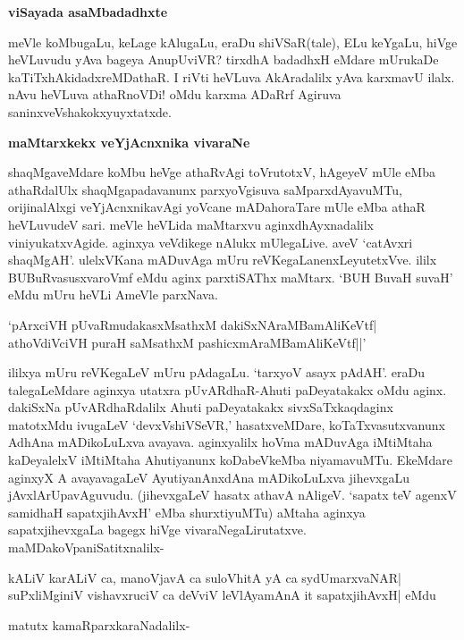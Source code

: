 {\bigskip
\noindent
{\large\bf viSayada asaMbadadhxte}}\label{page115}
\medskip

\noindent
meVle koMbugaLu, keLage kAlugaLu, eraDu shiVSaR(tale), ELu keYgaLu, hiVge heVLuvudu yAva bageya AnupUviVR? tirxdhA badadhxH eMdare mUrukaDe kaTiTxhAkidadxreMDathaR. I riVti heVLuva AkAradalilx yAva karxmavU ilalx. nAvu heVLuva athaRnoVDi! oMdu karxma ADaRrf Agiruva saninxveVshakokxyuyxtatxde.

{\bigskip
\noindent
{\large\bf maMtarxkekx veYjAcnxnika vivaraNe}}\label{page115}
\medskip

\noindent
shaqMgaveMdare koMbu heVge athaRvAgi toVrutotxV, hAgeyeV mUle eMba athaRdalUlx shaqMga\-pada\-vanunx parxyoVgisuva saMparxdAyavuMTu, orijinalAlxgi veYjAcnxnikavAgi yoVcane mADahoraTare mUle eMba athaR heVLuvudeV sari. meVle heVLida maMtarxvu aginxdhAyxnadalilx viniyukatxvAgide. aginxya veVdikege nAlukx mUlegaLive. aveV `catAvxri shaqMgAH'. ulelxVKana mADuvAga mUru reVKegaLanenxLeyu\-tetxVve. ililx BUBuRvasusxvaroVmf eMdu aginx parxtiSAThx maMtarx. `BUH BuvaH suvaH' eMdu mUru heVLi AmeVle parxNava.

\begin{shloka}
`pArxciVH pUvaRmudakasxMsathxM dakiSxNAraMBamAliKeVtf|\\\label{115}
athoVdiVciVH puraH saMsathxM pashicxmAraMBamAliKeVtf||'
\end{shloka}

ililxya mUru reVKegaLeV mUru pAdagaLu. `tarxyoV asayx pAdAH'. eraDu 
talegaLeMdare aginxya\- utatxra pUvARdhaR-Ahuti paDeyatakakx oMdu aginx. dakiSxNa pUvARdhaRdalilx Ahuti paDeyatakakx sivxSaTxkaq\-daginx matotxMdu ivugaLeV `devxVshiVSeVR,' hasatxveMDare, koTaTxvasutxvanunx AdhAna mADikoLuLxva avayava. aginxyalilx hoVma mADuvAga iMtiMtaha kaDeyalelxV iMtiMtaha Ahutiyanunx koDa\-beVkeMba niyama\-vuMTu. EkeMdare aginxyX A avayavagaLeV AyutiyanAnxdAna mADikoLuLxva jihevx\-gaLu jAvxlArUpa\-vAgu\-vudu. (jihevxgaLeV hasatx athavA nAligeV. `sapatx teV agenxV samidhaH sapatxjihAvxH' eMba shurxti\-yuMTu) aMtaha aginxya sapatxjihevxgaLa bagegx hiVge vivaraNegaLirutatxve. maMDakoVpaniSatitxnalilx-

\begin{shloka}
kALiV karALiV ca, manoVjavA ca suloVhitA yA ca sydUmarxvaNAR|\\\label{116}
suPxliMginiV vishavxruciV ca deVviV leVlAyamAnA it sapatxjihAvxH| eMdu\\
\end{shloka}

\noindent
matutx kamaRparxkaraNadalilx-

